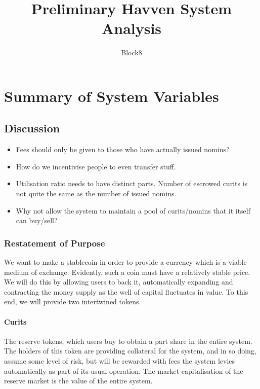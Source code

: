 \documentclass{article}
\begin{document}
\title{Preliminary Havven System Analysis}
\author{Block8}

\begin{figure}
    
\end{figure}
\maketitle

\section{Summary of System Variables}

\subsection{Discussion}

\begin{itemize}
    \item Fees should only be given to those who have actually issued nomins?
    \item How do we incentivise people to even transfer stuff.
    \item Utilisation ratio needs to have distinct parts. Number of escrowed curits is not quite the same as the number of issued nomins.
    \item Why not allow the system to maintain a pool of curits/nomins that it itself can buy/sell?
\end{itemize}

\subsubsection{Restatement of Purpose}
We want to make a stablecoin in order to provide a currency which is a viable medium of exchange.
Evidently, such a coin must have a relatively stable price. We will do this by allowing users to back it,
automatically expanding and contracting the money supply as the well of capital fluctuates in value.
To this end, we will provide two intertwined tokens.
\paragraph{Curits} The reserve tokens, which users buy to obtain a part share in the entire system. The holders
of this token are providing collateral for the system, and in so doing, assume some level of risk, but will
be rewarded with fees the system levies automatically as part of its usual operation. The market capitalisation
of the reserve market is the value of the entire system.
\end{document}
